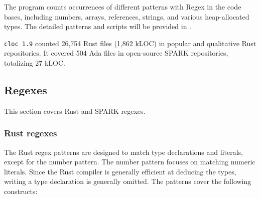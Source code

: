 \documentclass[nomenclature, english, bibtex]{kththesis}
\begin{document}
The program counts occurrences of different patterns with Regex in the code bases, including numbers, arrays, references, strings, and various heap-allocated types. The detailed patterns and scripts will be provided in .

\texttt{cloc 1.9} counted 26,754 Rust files (1,862 k\gls{LOC}) in popular and qualitative Rust repositories. It covered 504 Ada files in open-source SPARK repositories, totalizing 27 kLOC.

\subsection{Regexes}
This section covers Rust and SPARK regexes.
\subsubsection{Rust regexes}

The Rust regex patterns are designed to match type declarations and literals, except for the number pattern. The number pattern focuses on matching numeric literals. Since the Rust compiler is generally efficient at deducing the types, writing a type declaration is generally omitted. The patterns cover the following constructs:
\end{document}
